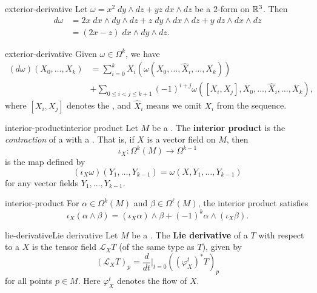 \begin{example}{exterior-derivative}
    Let $\omega = x^2 \; dy \wedge dz + yz \; dx \wedge dz$ be a $2$-form on $\mathbb{R}^3$. Then
    \[ \begin{aligned}
        d\omega
            &= 2x \; dx \wedge dy \wedge dz + z \; dy \wedge dx \wedge dz + y \; dz \wedge dx \wedge dz \\
            &= (2x - z) \; dx \wedge dy \wedge dz .
    \end{aligned} \]
\end{example}

\begin{example}{exterior-derivative}
    Given $\omega \in \Omega^k$, we have
    \[ \begin{aligned} (d\omega)(X_0, \ldots, X_k) &= \sum_{i = 0}^{k} X_i\left( \omega\left(X_0, \ldots, \widehat{X}_i, \ldots, X_k \right) \right) \\ &+ \sum_{0 \le i < j \le k + 1} (-1)^{i + j} \omega\left([X_i, X_j], X_0, \ldots, \widehat{X}_i, \ldots, X_k \right) , \end{aligned} \]
    where $[X_i, X_j]$ denotes the , and $\hat{X}_i$ means we omit $X_i$ from the sequence.
\end{example}

\begin{topic}{interior-product}{interior product}
    Let $M$ be a . The \textbf{interior product} is the \textit{contraction} of a  with a . That is, if $X$ is a vector field on $M$, then
    \[ \iota_X : \Omega^k(M) \to \Omega^{k - 1} \]
    is the map defined by
    \[ (\iota_X \omega)(Y_1, \ldots, Y_{k - 1}) = \omega(X, Y_1, \ldots, Y_{k - 1}) \]
    for any vector fields $Y_1, \ldots, Y_{k - 1}$.
\end{topic}

\begin{example}{interior-product}
    For $\alpha \in \Omega^k(M)$ and $\beta \in \Omega^\ell(M)$, the interior product satisfies
    \[ \iota_X (\alpha \wedge \beta) = (\iota_X \alpha) \wedge \beta + (-1)^k \alpha \wedge (\iota_X \beta) . \]
\end{example}

\begin{topic}{lie-derivative}{Lie derivative}
    Let $M$ be a . The \textbf{Lie derivative} of a  $T$ with respect to a  $X$ is the tensor field $\mathcal{L}_X T$ (of the same type as $T$), given by
    \[ (\mathcal{L}_X T)_p = \frac{d}{dt}\Big|_{t = 0} \left( \left(\varphi^t_X\right)^* T \right)_p \]
    for all points $p \in M$. Here $\varphi^t_X$ denotes the flow of $X$.
\end{topic}


